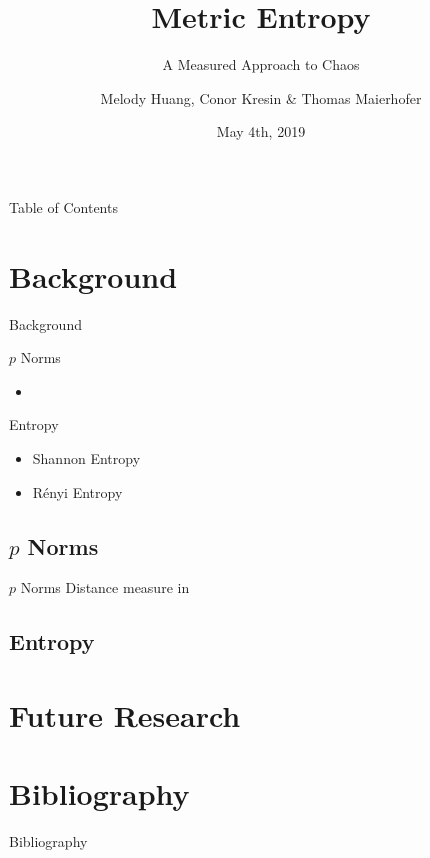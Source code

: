 \documentclass{beamer}
\title[STATS 200C Project Presentation]{Metric Entropy}
\subtitle{A Measured Approach to Chaos}
\author[Huang, Kresin \& Maierhofer]{
  Melody Huang, Conor Kresin \& Thomas Maierhofer\\
  \vspace{0.5cm}
}
\institute[]{Department of Statistics \\
  University of California, Los Angeles}
\date{May 4th, 2019}
\newcommand{\1}{\mathbb{1}}
\begin{document}
\begin{frame}
  \titlepage
\end{frame}


\begin{frame}{Table of Contents}
  \tableofcontents
\end{frame}

\section{Background}
\begin{frame} {Background}
    \begin{block}{$p$ Norms}
    \begin{itemize}
        \item 
    \end{itemize}
    \end{block}
    \begin{block}{Entropy}
    \begin{itemize}
        \item Shannon Entropy
        \item R\'enyi Entropy
    \end{itemize}
    \end{block}
\end{frame}

\subsection{$p$ Norms}
\begin{frame} {$p$ Norms}
    Distance measure in 
\end{frame}


\subsection{Entropy}



\section{Future Research}

\section*{Bibliography}
\begin{frame}{Bibliography}
   
  \small{}
\end{frame}

\nocite{maierhoferCoFD}
\end{document}
